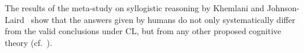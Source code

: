 \documentclass[12pt]{article}
\begin{document}
% 
The results of the meta-study on syllogistic reasoning by Khemlani and Johnson-Laird~\cite{khemlani:2012} show that the answers given by humans do not only systematically differ from the valid conclusions under CL, but from any other proposed cognitive theory (cf.~\cite{BJ89,johnsonlaird:1983,Rips1994,Polk1995,chater:oaksford:1999}).
\end{document}
